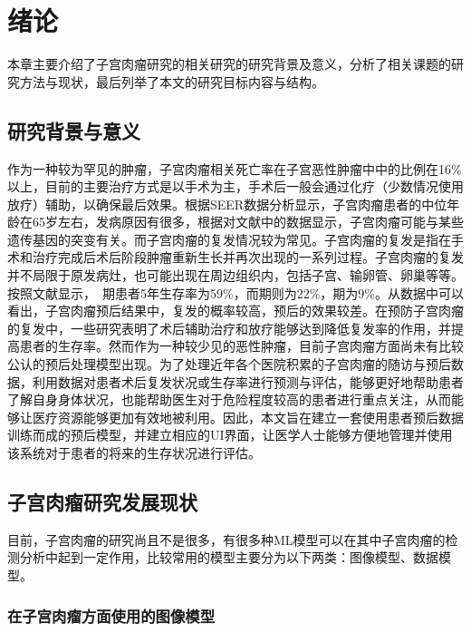 \chapter{绪论}
\label{cha:intro}

本章主要介绍了子宫肉瘤研究的相关研究的研究背景及意义，分析了相关课题的研究方法与现状，最后列举了本文的研究目标内容与结构。

\section{研究背景与意义}

作为一种较为罕见的肿瘤，子宫肉瘤相关死亡率在子宫恶性肿瘤中中的比例在16\%以上\cite{commonView}，目前的主要治疗方式是以手术为主，手术后一般会通过化疗（少数情况使用放疗）辅助，以确保最后效果。根据SEER数据分析显示，子宫肉瘤患者的中位年龄在65岁左右，发病原因有很多，根据对文献中的数据显示，子宫肉瘤可能与某些遗传基因的突变有关。而子宫肉瘤的复发情况较为常见。子宫肉瘤的复发是指在手术和治疗完成后术后阶段肿瘤重新生长并再次出现的一系列过程。子宫肉瘤的复发并不局限于原发病灶，也可能出现在周边组织内，包括子宫、输卵管、卵巢等等。按照文献显示，\uppercase\expandafter{}~\uppercase\expandafter{}期患者5年生存率为59\%，而\uppercase\expandafter{}期则为22\%，\uppercase\expandafter{}期为9\%。\cite{commonView}从数据中可以看出，子宫肉瘤预后结果中，复发的概率较高，预后的效果较差。在预防子宫肉瘤的复发中，一些研究表明了术后辅助治疗和放疗能够达到降低复发率的作用，并提高患者的生存率。然而作为一种较少见的恶性肿瘤，目前子宫肉瘤方面尚未有比较公认的预后处理模型出现。为了处理近年各个医院积累的子宫肉瘤的随访与预后数据，利用数据对患者术后复发状况或生存率进行预测与评估，能够更好地帮助患者了解自身身体状况，也能帮助医生对于危险程度较高的患者进行重点关注，从而能够让医疗资源能够更加有效地被利用。因此，本文旨在建立一套使用患者预后数据训练而成的预后模型，并建立相应的UI界面，让医学人士能够方便地管理并使用该系统对于患者的将来的生存状况进行评估。

\section{子宫肉瘤研究发展现状}

目前，子宫肉瘤的研究尚且不是很多，有很多种ML模型可以在其中子宫肉瘤的检测分析中起到一定作用，比较常用的模型主要分为以下两类：图像模型、数据模型。

\subsection{在子宫肉瘤方面使用的图像模型}

